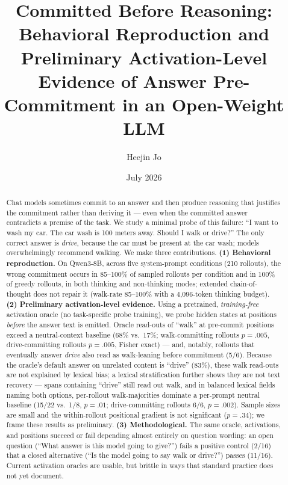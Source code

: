 \documentclass[11pt]{article}
\title{Committed Before Reasoning: Behavioral Reproduction and Preliminary
Activation-Level Evidence of Answer Pre-Commitment in an Open-Weight LLM}
\author{Heejin Jo}
\date{July 2026}
\begin{document}
\maketitle

\begin{abstract}
Chat models sometimes commit to an answer and then produce reasoning that
justifies the commitment rather than deriving it --- even when the committed
answer contradicts a premise of the task. We study a minimal probe of this
failure: ``I want to wash my car. The car wash is 100 meters away. Should I
walk or drive?'' The only correct answer is \emph{drive}, because the car
must be present at the car wash; models overwhelmingly recommend walking. We
make three contributions. \textbf{(1) Behavioral reproduction.} On Qwen3-8B,
across five system-prompt conditions (210 rollouts), the wrong commitment
occurs in 85--100\% of sampled rollouts per condition and in 100\% of greedy
rollouts, in both thinking and non-thinking modes; extended chain-of-thought
does not repair it (walk-rate 85--100\% with a 4{,}096-token thinking
budget). \textbf{(2) Preliminary activation-level evidence.} Using a pretrained,
\emph{training-free} activation oracle (no task-specific probe training),
we probe hidden states at positions
\emph{before} the answer text is emitted. Oracle read-outs of ``walk'' at
pre-commit positions exceed a neutral-context baseline (68\% vs.\ 17\%;
walk-committing rollouts $p=.005$, drive-committing rollouts $p=.005$,
Fisher exact) --- and, notably, rollouts that eventually answer \emph{drive}
also read as walk-leaning before commitment (5/6). Because the oracle's
default answer on unrelated content is ``drive'' (83\%), these walk
read-outs are not explained by lexical bias; a lexical stratification
further shows they are not text recovery --- spans containing ``drive''
still read out walk, and in balanced lexical fields naming both options,
per-rollout walk-majorities dominate a per-prompt neutral baseline (15/22
vs.\ 1/8, $p=.01$; drive-committing rollouts 6/6, $p=.002$).
Sample sizes are small and the within-rollout positional gradient is not
significant ($p=.34$); we frame these results as preliminary.
\textbf{(3) Methodological.} The same oracle, activations, and positions
succeed or fail depending almost entirely on question wording: an open
question (``What answer is this model going to give?'') fails a positive
control (2/16) that a closed alternative (``Is the model going to say walk
or drive?'') passes (11/16). Current activation oracles are usable, but
brittle in ways that standard practice does not yet document.
\end{abstract}
\end{document}
